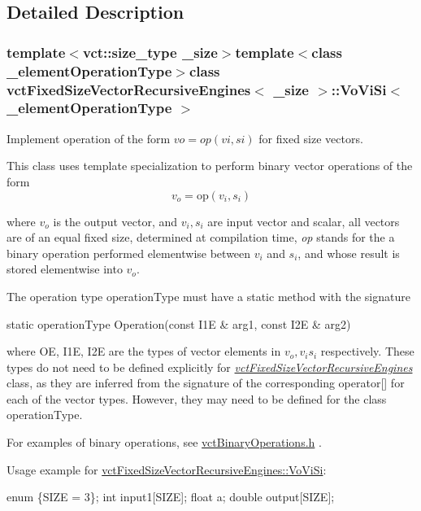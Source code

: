 \subsection{Detailed Description}
\subsubsection*{template$<$vct\-::size\-\_\-type \-\_\-size$>$template$<$class \-\_\-element\-Operation\-Type$>$class vct\-Fixed\-Size\-Vector\-Recursive\-Engines$<$ \-\_\-size $>$\-::\-Vo\-Vi\-Si$<$ \-\_\-element\-Operation\-Type $>$}

Implement operation of the form $vo = op(vi, si)$ for fixed size vectors. 

This class uses template specialization to perform binary vector operations of the form \[ v_o = \mathrm{op}(v_i, s_i) \]

where $v_o$ is the output vector, and $v_i, s_i$ are input vector and scalar, all vectors are of an equal fixed size, determined at compilation time, {\itshape op} stands for the a binary operation performed elementwise between $v_i$ and $s_i$, and whose result is stored elementwise into $v_o$.

The operation type operation\-Type must have a static method with the signature


\begin{DoxyPre}
static operationType Operation(const I1E & arg1, const I2E & arg2)
\end{DoxyPre}


where O\-E, I1\-E, I2\-E are the types of vector elements in $v_o, v_i s_i$ respectively. These types do not need to be defined explicitly for {\itshape \hyperlink{classvct_fixed_size_vector_recursive_engines}{vct\-Fixed\-Size\-Vector\-Recursive\-Engines}} class, as they are inferred from the signature of the corresponding operator\mbox{[}\mbox{]} for each of the vector types. However, they may need to be defined for the class operation\-Type.

For examples of binary operations, see \hyperlink{vct_binary_operations_8h}{vct\-Binary\-Operations.\-h} .

Usage example for \hyperlink{classvct_fixed_size_vector_recursive_engines_1_1_vo_vi_si}{vct\-Fixed\-Size\-Vector\-Recursive\-Engines\-::\-Vo\-Vi\-Si}\-: 
\begin{DoxyPre}
enum \{SIZE = 3\};
int input1[SIZE];
float a;
double output[SIZE];\end{DoxyPre}



